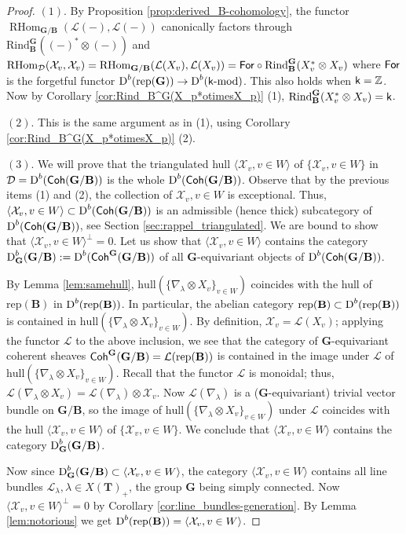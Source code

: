 \documentclass[sn-mathphys-num]{sn-jnl}%
\newcommand{\tX}{{\mathcal X}}
\newcommand{\Ll}{\mathcal L}
\newcommand{\D}{\mathcal D}
\newcommand{\subsetq}{\subset}
\newcommand{\rep}{{\mathrm{rep}}}
\newcommand{\Rind}{{\mathrm{Rind}}}
\newcommand{\hull}{{\mathrm{hull}}}
\newcommand*{\Dd}{\mathop{\mathrm D\kern0pt}\nolimits}
\newcommand*{\RHom}{\mathop{\mathrm {RHom}}\nolimits}
\newcommand*{\Coh}{\mathop{\sf {Coh}}\nolimits}
\newcommand{\sk}{{\sf k}}
\newcommand{\Z}{{\mathbb Z}}
\newcommand{\kmod}{\sk\textrm{-}\mathrm{mod}}
\newcommand{\bg}{\mathbf G}
\newcommand{\fb}{\mathbf B}
\newcommand{\bt}{\mathbf T}
\theoremstyle{definition}
\begin{document}
\begin{proof}
$(1)$. By Proposition \ref{prop:derived_B-cohomology}, the functor 
$\RHom _{ \bg/\fb}(\Ll (-),\Ll (-))$ canonically factors through $\Rind _{\fb}^{ \bg}((-)^{\ast}\otimes (-))$
and $\RHom_\D(\tX_v,\tX_v)=\RHom _{ \bg/\fb}(\Ll (X_v),\Ll (X_v))={\sf For}\circ \Rind_{\fb}^{ \bg}(X_v^{\ast}\otimes X_v)$ where $\sf For$ is the forgetful functor $\Dd ^b(\rep( \bg))\rightarrow \Dd ^b( {\kmod})$. This also holds when $\sk=\Z$.
Now by Corollary \ref{cor:Rind_B^G(X_p*otimesX_p)} (1), $\Rind_{\fb}^{ \bg}(X_v^{\ast}\otimes X_v)=\sk$. 



$(2)$. This is the same argument as in (1), using Corollary \ref{cor:Rind_B^G(X_p*otimesX_p)} (2).





$(3).$  We 
will prove that 
the 
triangulated hull $\langle \tX_v, v\in W\rangle$ of $\{\tX_v, v\in W\}$ in $\D=\Dd^b (\Coh( \bg/\fb))$
is the whole $\Dd^b (\Coh( \bg/\fb))$. Observe that by the previous items (1) and (2), the collection of $\tX_v, v\in W$ is exceptional. 
Thus,  $\langle \tX_v, v\in W\rangle\subsetq \Dd^b (\Coh( \bg/\fb))$ is an admissible (hence thick) subcategory of $\Dd^b (\Coh( \bg/\fb))$, see Section \ref{sec:rappel_triangulated}. We are bound to show that $\langle\tX_v, v\in W\rangle^{\perp}=0$. Let us show that $\langle \tX_v, v\in W\rangle$ contains the category $\Dd ^b_{ \bg}( \bg/ \fb):=\Dd ^b({\sf Coh}^{ \bg}( \bg/ \fb))$
of all $ \bg$-equivariant objects of $\Dd^b (\Coh( \bg/\fb))$. 

By Lemma \ref{lem:samehull},  $\hull(\{\nabla_\lambda\otimes X_v\}_{v\in W})$ coincides with the hull of $\rep( \fb)$ in $\Dd^b (\rep ({\fb}))$. 
In particular, the abelian category $\rep( \fb)\subset \Dd^b (\rep ({\fb}))$ is contained in  $\hull(\{\nabla_{\lambda}\otimes X_v\}_{v\in W})$. 
By definition, $\tX_v=\Ll (X_v)$; applying the functor $\Ll$ to the above inclusion, we see that the category of $ \bg$-equivariant coherent sheaves ${\sf Coh}^{ \bg}( \bg/ \fb)=\Ll (\rep( \fb))$ is contained in the image under 
$\Ll$ of  $\hull(\{\nabla_{\lambda}\otimes X_v\}_{v\in W})$. 
Recall that the functor $\Ll$ is monoidal; thus, $\Ll (\nabla_{\lambda}\otimes X_v)=\Ll (\nabla_{\lambda})\otimes\tX_v$. 
Now $\Ll (\nabla_{\lambda})$ is a ($ \bg$-equivariant) trivial vector bundle on $ \bg/ \fb$, so the image of 
$\hull(\{\nabla_{\lambda}\otimes X_v\}_{v\in W})$ under $\Ll$ coincides with the hull $\langle \tX_v, v\in W\rangle$ of $\{ \tX_v, v\in W\}$. 
We conclude that $\langle \tX_v, v\in W\rangle$ contains the category $\Dd ^b_{ \bg}( \bg/ \fb)$.

Now since $\Dd ^b_{ \bg}( \bg/ \fb)\subsetq \langle \tX_v, v\in W\rangle$, the  category $\langle \tX_v, v\in W\rangle$
contains all line bundles $\Ll _{\lambda},\lambda \in X(\bt)_+$, the group $ \bg$ being simply connected. Now
$\langle \tX_v, v\in W\rangle^\perp=0$ by Corollary \ref{cor:line_bundles-generation}.
 By Lemma \ref{lem:notorious} we get $\Dd^b (\rep ({\fb}))=\langle \tX_v, v\in W\rangle$.
\end{proof}
\end{document}
